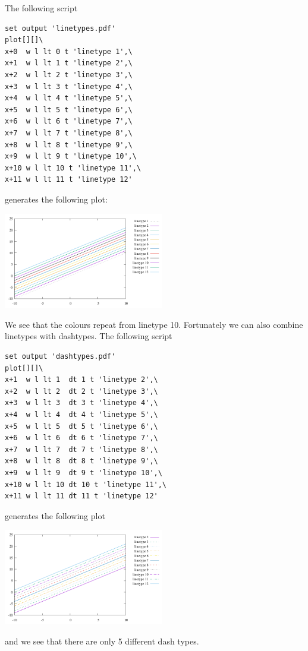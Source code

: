 The following script
\begin{verbatim}
set output 'linetypes.pdf'
plot[][]\
x+0  w l lt 0 t 'linetype 1',\
x+1  w l lt 1 t 'linetype 2',\
x+2  w l lt 2 t 'linetype 3',\
x+3  w l lt 3 t 'linetype 4',\
x+4  w l lt 4 t 'linetype 5',\
x+5  w l lt 5 t 'linetype 6',\
x+6  w l lt 6 t 'linetype 7',\
x+7  w l lt 7 t 'linetype 8',\
x+8  w l lt 8 t 'linetype 9',\
x+9  w l lt 9 t 'linetype 10',\
x+10 w l lt 10 t 'linetype 11',\
x+11 w l lt 11 t 'linetype 12'
\end{verbatim}
generates the following plot:
\begin{center}
\includegraphics[width=7cm]{images/gnuplot/linetypes.pdf}
\end{center}
We see that the colours repeat from linetype 10. 
Fortunately we can also combine linetypes with dashtypes.
The following script
\begin{verbatim}
set output 'dashtypes.pdf'
plot[][]\
x+1  w l lt 1  dt 1 t 'linetype 2',\
x+2  w l lt 2  dt 2 t 'linetype 3',\
x+3  w l lt 3  dt 3 t 'linetype 4',\
x+4  w l lt 4  dt 4 t 'linetype 5',\
x+5  w l lt 5  dt 5 t 'linetype 6',\
x+6  w l lt 6  dt 6 t 'linetype 7',\
x+7  w l lt 7  dt 7 t 'linetype 8',\
x+8  w l lt 8  dt 8 t 'linetype 9',\
x+9  w l lt 9  dt 9 t 'linetype 10',\
x+10 w l lt 10 dt 10 t 'linetype 11',\
x+11 w l lt 11 dt 11 t 'linetype 12' 
\end{verbatim}
generates the following plot
\begin{center}
\includegraphics[width=7cm]{images/gnuplot/dashtypes.pdf}
\end{center}
and we see that there are only 5 different dash types. 

